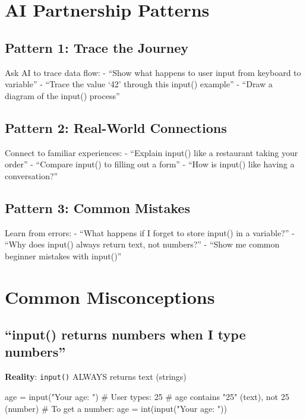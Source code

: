 \documentclass[
  letterpaper,
  DIV=11,
  numbers=noendperiod,
  oneside]{scrreprt}
\newenvironment{Shaded}{}{}
\newcommand{\BuiltInTok}[1]{\textcolor[rgb]{0.84,0.23,0.29}{#1}}
\newcommand{\CommentTok}[1]{\textcolor[rgb]{0.42,0.45,0.49}{#1}}
\newcommand{\NormalTok}[1]{\textcolor[rgb]{0.14,0.16,0.18}{#1}}
\newcommand{\OperatorTok}[1]{\textcolor[rgb]{0.14,0.16,0.18}{#1}}
\newcommand{\StringTok}[1]{\textcolor[rgb]{0.01,0.18,0.38}{#1}}
\begin{document}
\section{AI Partnership Patterns}\label{ai-partnership-patterns-2}

\subsection{Pattern 1: Trace the
Journey}\label{pattern-1-trace-the-journey}

Ask AI to trace data flow: - ``Show what happens to user input from
keyboard to variable'' - ``Trace the value `42' through this input()
example'' - ``Draw a diagram of the input() process''

\subsection{Pattern 2: Real-World
Connections}\label{pattern-2-real-world-connections}

Connect to familiar experiences: - ``Explain input() like a restaurant
taking your order'' - ``Compare input() to filling out a form'' - ``How
is input() like having a conversation?''

\subsection{Pattern 3: Common Mistakes}\label{pattern-3-common-mistakes}

Learn from errors: - ``What happens if I forget to store input() in a
variable?'' - ``Why does input() always return text, not numbers?'' -
``Show me common beginner mistakes with input()''

\section{Common Misconceptions}\label{common-misconceptions-2}

\subsection{``input() returns numbers when I type
numbers''}\label{input-returns-numbers-when-i-type-numbers}

\textbf{Reality}: \texttt{input()} ALWAYS returns text (strings)

\begin{Shaded}
\begin{Highlighting}[]
\NormalTok{age }\OperatorTok{=} \BuiltInTok{input}\NormalTok{(}\StringTok{"Your age: "}\NormalTok{)  }\CommentTok{\# User types: 25}
\CommentTok{\# age contains "25" (text), not 25 (number)}
\CommentTok{\# To get a number: age = int(input("Your age: "))}
\end{Highlighting}
\end{Shaded}
\end{document}

